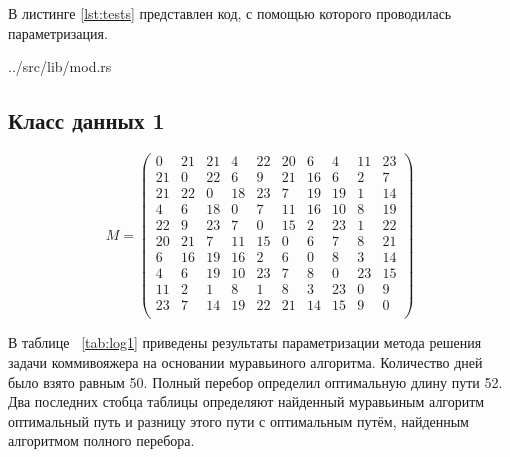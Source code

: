 В листинге \ref{lst:tests} представлен код, с помощью которого проводилась параметризация.

\begin{lstinputlisting}[
        caption={Код для параметризации.},
        label={lst:tests},
        style={rust},
        linerange={34-80}
    ]{../src/lib/mod.rs}
\end{lstinputlisting}


\subsection{Класс данных 1}
\begin{equation}
    \label{matrix}
    M = \begin{pmatrix}
        0 &    21 &    21 &     4 &    22 &    20 &     6 &     4 &    11 &    23 \\
        21 &     0 &    22 &     6 &     9 &    21 &    16 &     6 &     2 &     7 \\
        21 &    22 &     0 &    18 &    23 &     7 &    19 &    19 &     1 &    14 \\
        4 &     6 &    18 &     0 &     7 &    11 &    16 &    10 &     8 &    19 \\
        22 &     9 &    23 &     7 &     0 &    15 &     2 &    23 &     1 &    22 \\
        20 &    21 &     7 &    11 &    15 &     0 &     6 &     7 &     8 &    21 \\
        6 &    16 &    19 &    16 &     2 &     6 &     0 &     8 &     3 &    14 \\
        4 &     6 &    19 &    10 &    23 &     7 &     8 &     0 &    23 &    15 \\
        11 &     2 &     1 &     8 &     1 &     8 &     3 &    23 &     0 &     9 \\
        23 &     7 &    14 &    19 &    22 &    21 &    14 &    15 &     9 &     0 \\
    \end{pmatrix}
\end{equation}

В таблице ~\ref{tab:log1} приведены результаты параметризации метода решения задачи коммивояжера на основании муравьиного алгоритма. Количество дней было взято равным 50. Полный перебор определил оптимальную длину пути 52. Два последних стобца таблицы определяют найденный муравьиным алгоритм оптимальный путь и разницу этого пути с оптимальным путём, найденным алгоритмом полного перебора.

